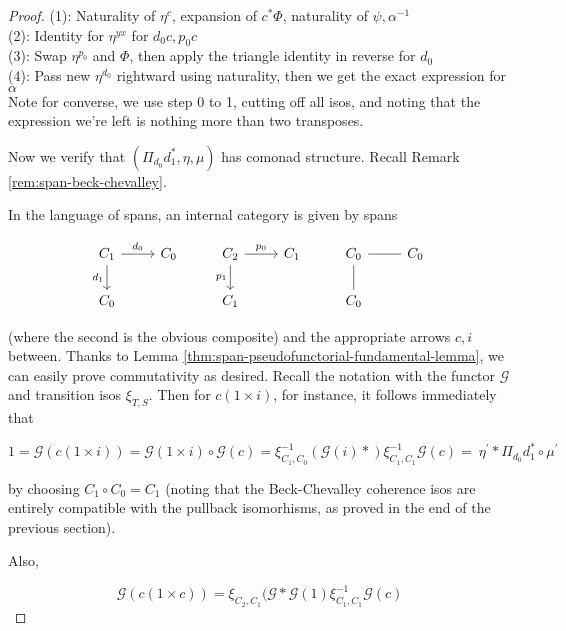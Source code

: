 \documentclass[10pt, oneside]{article}
\begin{document}
\begin{proof}
\noindent
(1): Naturality of $\eta^c$, expansion of $c^\ast \Phi$, naturality of $\psi, \alpha^{-1}$ \\
(2): Identity for $\eta^{yx}$ for $d_0c, p_0c$ \\
(3): Swap $\eta^{p_0}$ and $\Phi$, then apply the triangle identity in reverse for $d_0$ \\
(4): Pass new $\eta^{d_0}$ rightward using naturality, then we get the exact expression for $\alpha$ \\

Note for converse, we use step 0 to 1, cutting off all isos, and noting that the expression we're left is nothing more than two transposes.

Now we verify that $(\Pi_{d_0} d_1^\ast, \eta, \mu)$ has comonad structure. Recall Remark \ref{rem:span-beck-chevalley}.

In the language of spans, an internal category is given by spans

\[\begin{tikzcd}[ampersand replacement=\&]
	{C_1} \& {C_0} \& {C_2} \& {C_1} \& {C_0} \& {C_0} \\
	{C_0} \&\& {C_1} \&\& {C_0}
	\arrow["{d_1}"', from=1-1, to=2-1]
	\arrow["{d_0}", from=1-1, to=1-2]
	\arrow["{p_1}"', from=1-3, to=2-3]
	\arrow["{p_0}", from=1-3, to=1-4]
	\arrow[no head, from=1-5, to=2-5]
	\arrow[no head, from=1-5, to=1-6]
\end{tikzcd}\]

\noindent (where the second is the obvious composite) and the appropriate arrows $c, i$ between. Thanks to Lemma \ref{thm:span-pseudofunctorial-fundamental-lemma}, we can easily prove commutativity as desired. Recall the notation with the functor $\mathcal{G}$ and transition isos $\xi_{T, S}$. Then for $c(1 \times i)$, for instance, it follows immediately that

$$1 = \mathcal{G}(c (1 \times i)) = \mathcal{G}(1 \times i) \circ \mathcal{G}(c) = \xi_{C_1, C_0}^{-1} (\mathcal{G}(i) \ast) \xi_{C_1, C_1}^{-1} \mathcal{G}(c) = \ \eta^\prime \ast \Pi_{d_0} d_1^\ast \circ \mu^\prime$$

\noindent by choosing $C_1 \circ C_0 = C_1$ (noting that the Beck-Chevalley coherence isos are entirely compatible with the pullback isomorhisms, as proved in the end of the previous section).

Also,

$$\mathcal{G}(c(1 \times c)) = \xi_{C_2, C_1} (\mathcal{G} \ast \mathcal{G}(1) \xi_{C_1, C_1}^{-1} \mathcal{G}(c)$$


\end{proof}
\end{document}
